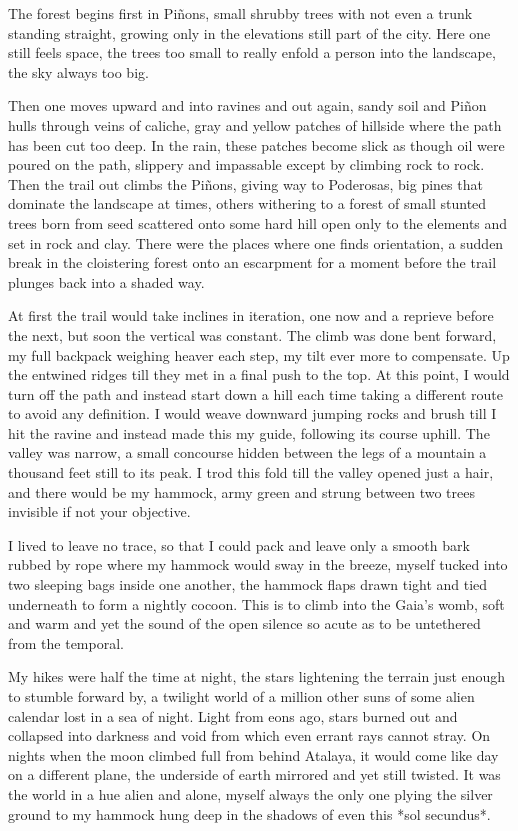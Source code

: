 \documentclass[ebook, 10pt, openright, onecolumn]{memoir}
\begin{document}
The forest begins first in Piñons, small shrubby trees with not even a trunk
standing straight, growing only in the elevations still part of the city.  Here
one still feels space, the trees too small to really enfold a person into the
landscape, the sky always too big. 

Then one moves upward and into ravines and out again, sandy soil and Piñon hulls
through veins of caliche, gray and yellow patches of hillside where the path has
been cut too deep. In the rain, these patches become slick as though oil were
poured on the path, slippery and impassable except by climbing rock to rock.
Then the trail out climbs the Piñons, giving way to Poderosas, big pines that
dominate the landscape at times, others withering to a forest of small stunted
trees born from seed scattered onto some hard hill open only to the elements
and set in rock and clay.  There were the places where one finds orientation, a
sudden break in the cloistering forest onto an escarpment for a moment before the
trail plunges back into a shaded way.

At first the trail would take inclines in iteration, one now and a reprieve
before the next, but soon the vertical was constant.  The climb was done bent
forward, my full backpack weighing heaver each step, my tilt ever more to
compensate.  Up the entwined ridges till they met in a final push to the top.
At this point, I would turn off the path and instead start down a hill each time
taking a different route to avoid any definition. I would weave downward jumping
rocks and brush till I hit the ravine and instead made this my guide, following
its course uphill.  The valley was narrow, a small concourse hidden between the
legs of a mountain a thousand feet still to its peak.  I trod this fold till the
valley opened just a hair, and there would be my hammock, army green and strung
between two trees invisible if not your objective.

I lived to leave no trace, so that I could pack and leave only a smooth bark
rubbed by rope where my hammock would sway in the breeze, myself tucked into two
sleeping bags inside one another, the hammock flaps drawn tight and tied
underneath to form a nightly cocoon.  This is to climb into the Gaia's womb,
soft and warm and yet the sound of the open silence so acute as to be untethered
from the temporal.

My hikes were half the time at night, the stars lightening the terrain just
enough to stumble forward by, a twilight world of a million other suns of some
alien calendar lost in a sea of night.  Light from eons ago, stars burned out
and collapsed into darkness and void from which even errant rays cannot stray.
On nights when the moon climbed full from behind Atalaya, it would come like day
on a different plane, the underside of earth mirrored and yet still twisted.  It
was the world in a hue alien and alone, myself always the only one plying the
silver ground to my hammock hung deep in the shadows of even this *sol
secundus*.
\end{document}
